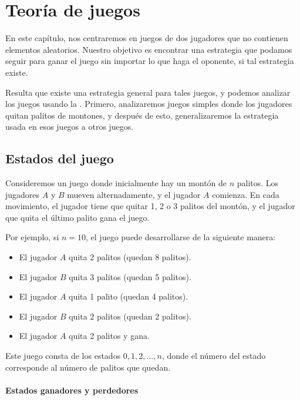 \chapter{Teoría de juegos}

En este capítulo, nos centraremos en juegos de dos jugadores
que no contienen elementos aleatorios.
Nuestro objetivo es encontrar una estrategia que podamos
seguir para ganar el juego
sin importar lo que haga el oponente,
si tal estrategia existe.

Resulta que existe una estrategia general
para tales juegos,
y podemos analizar los juegos usando la .
Primero, analizaremos juegos simples donde
los jugadores quitan palitos de montones,
y después de esto, generalizaremos la estrategia
usada en esos juegos a otros juegos.

\section{Estados del juego}

Consideremos un juego donde inicialmente hay
un montón de $n$ palitos.
Los jugadores $A$ y $B$ mueven alternadamente,
y el jugador $A$ comienza.
En cada movimiento, el jugador tiene que quitar
1, 2 o 3 palitos del montón,
y el jugador que quita el último palito gana el juego.

Por ejemplo, si $n=10$, el juego puede desarrollarse de la siguiente manera:
\begin{itemize}[noitemsep]
\item El jugador $A$ quita 2 palitos (quedan 8 palitos).
\item El jugador $B$ quita 3 palitos (quedan 5 palitos).
\item El jugador $A$ quita 1 palito (quedan 4 palitos).
\item El jugador $B$ quita 2 palitos (quedan 2 palitos).
\item El jugador $A$ quita 2 palitos y gana.
\end{itemize}

Este juego consta de los estados $0,1,2,\ldots,n$,
donde el número del estado corresponde al
número de palitos que quedan.

\subsubsection{Estados ganadores y perdedores}


